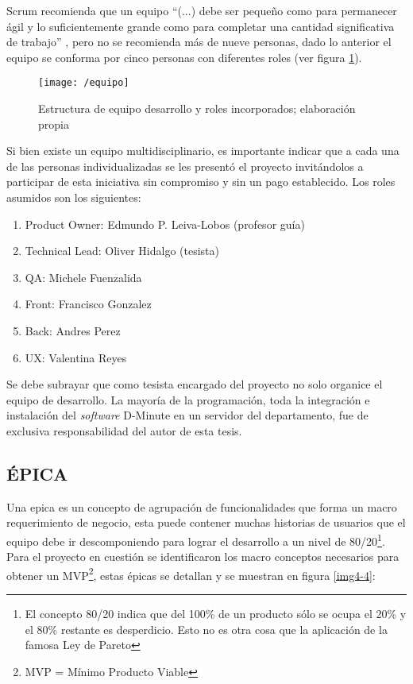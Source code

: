 Scrum recomienda que un equipo “(...) debe ser pequeño como para permanecer ágil y lo suficientemente grande como para completar una cantidad significativa de trabajo” , pero no se recomienda más de nueve personas, dado lo anterior el equipo se conforma por cinco personas con diferentes roles (ver figura \ref{img4-3}).

\begin{figure}[!h]
\centering
\texttt{[image: /equipo]}
\caption{Estructura de equipo desarrollo y roles incorporados; elaboración propia} 
\label{img4-3}
\end{figure}

Si bien existe un equipo multidisciplinario, es importante indicar que a cada una de las personas individualizadas se les presentó el proyecto invitándolos a participar de esta iniciativa sin compromiso y sin un pago establecido. Los roles asumidos son los siguientes:

\begin{enumerate}[1.]
    \item Product Owner: Edmundo P. Leiva-Lobos (profesor guía)
    \item Technical Lead: Oliver Hidalgo (tesista)
    \item QA: Michele Fuenzalida
    \item Front: Francisco Gonzalez 
    \item Back: Andres Perez
    \item UX: Valentina Reyes
\end{enumerate}

Se debe subrayar que como tesista encargado del proyecto no solo organice el equipo de desarrollo. La mayoría de la programación, toda la integración e instalación del \textit{software} D-Minute en un servidor del departamento, fue de exclusiva responsabilidad del autor de esta tesis.

\subsection{ÉPICA}

Una epica es un concepto de agrupación  de funcionalidades que forma un macro requerimiento de negocio, esta puede contener muchas historias de usuarios que el equipo debe ir descomponiendo para lograr el desarrollo a un nivel de 80/20\footnote{ El concepto 80/20 indica que del 100\% de un producto sólo se ocupa el 20\% y el 80\% restante es desperdicio. Esto no es otra cosa que la aplicación de la famosa Ley de Pareto}. Para el proyecto en cuestión se identificaron los macro conceptos necesarios para obtener un MVP\footnote{MVP = Mínimo Producto Viable}, estas épicas se detallan y se muestran en figura \ref{img4-4}:


